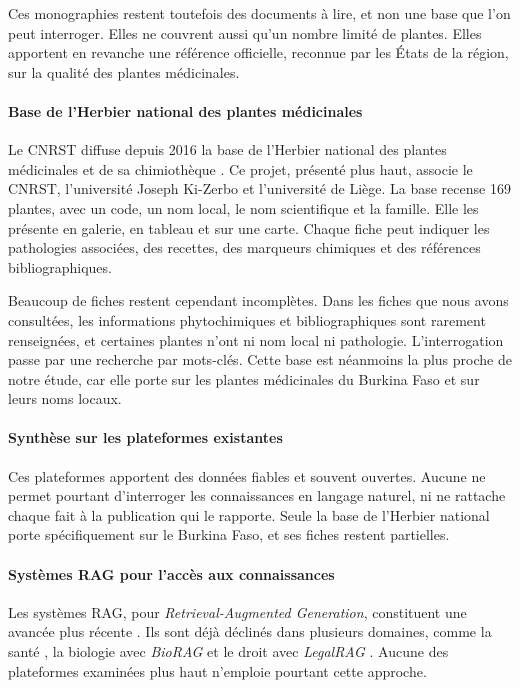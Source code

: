 Ces monographies restent toutefois des documents à lire, et non une base que l'on peut interroger. Elles ne couvrent aussi qu'un nombre limité de plantes. Elles apportent en revanche une référence officielle, reconnue par les États de la région, sur la qualité des plantes médicinales.

\paragraph{Base de l'Herbier national des plantes médicinales}
Le CNRST diffuse depuis 2016 la base de l'Herbier national des plantes médicinales et de sa chimiothèque \cite{burkinaherbiermed}. Ce projet, présenté plus haut, associe le CNRST, l'université Joseph Ki-Zerbo et l'université de Liège. La base recense 169 plantes, avec un code, un nom local, le nom scientifique et la famille. Elle les présente en galerie, en tableau et sur une carte. Chaque fiche peut indiquer les pathologies associées, des recettes, des marqueurs chimiques et des références bibliographiques.

Beaucoup de fiches restent cependant incomplètes. Dans les fiches que nous avons consultées, les informations phytochimiques et bibliographiques sont rarement renseignées, et certaines plantes n'ont ni nom local ni pathologie. L'interrogation passe par une recherche par mots-clés. Cette base est néanmoins la plus proche de notre étude, car elle porte sur les plantes médicinales du Burkina Faso et sur leurs noms locaux.

\paragraph{Synthèse sur les plateformes existantes}
Ces plateformes apportent des données fiables et souvent ouvertes. Aucune ne permet pourtant d'interroger les connaissances en langage naturel, ni ne rattache chaque fait à la publication qui le rapporte. Seule la base de l'Herbier national porte spécifiquement sur le Burkina Faso, et ses fiches restent partielles.

\paragraph{Systèmes RAG pour l'accès aux connaissances}
Les systèmes RAG, pour \textit{Retrieval-Augmented Generation}, constituent une avancée plus récente \cite{lewis2020rag}. Ils sont déjà déclinés dans plusieurs domaines, comme la santé \cite{neha_retrieval-augmented_2025}, la biologie avec \textit{BioRAG} \cite{wang2024biorag} et le droit avec \textit{LegalRAG} \cite{kabir2025legalrag}. Aucune des plateformes examinées plus haut n'emploie pourtant cette approche.

